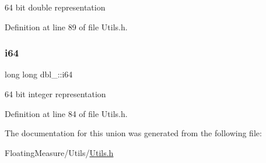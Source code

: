 64 bit double representation 



Definition at line 89 of file Utils.\+h.

\mbox{\label{uniondbl__64_a6f97524990aa26aaa1618b7288301841}} 
\subsubsection{\texorpdfstring{i64}{i64}}
{\footnotesize\ttfamily long long dbl\+\_\+::i64}



64 bit integer representation 



Definition at line 84 of file Utils.\+h.



The documentation for this union was generated from the following file\+:\begin{DoxyCompactItemize}
\item 
Floating\+Measure/\+Utils/\hyperlink{Utils_8h}{Utils.\+h}\end{DoxyCompactItemize}
